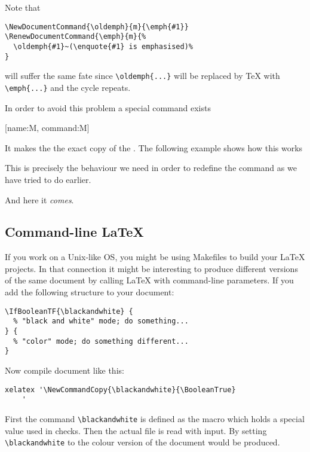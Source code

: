 Note that
\begin{verbatim}
\NewDocumentCommand{\oldemph}{m}{\emph{#1}}
\RenewDocumentCommand{\emph}{m}{%
  \oldemph{#1}~(\enquote{#1} is emphasised)%
}
\end{verbatim}
will suffer the same fate since \verb|\oldemph{...}| will be replaced by \TeX{}
with \verb|\emph{...}| and the cycle repeats.

In order to avoid this problem a special command exists
\begin{lscommand}
  [name:M, command:M]
\end{lscommand}
It makes the  the exact copy of the . The following example shows how this works
\begin{example}[examplewidth=0.35\linewidth]

\NewDocumentCommand{\newfoo}{}{\foo}
\NewCommandCopy{\copiedfoo}{\foo}


\foo{} \newfoo{} \copiedfoo{}
\end{example}

This is precisely the behaviour we need in order to redefine the 
command as we have tried to do earlier.
\begin{example}[examplewidth=0.35\linewidth]
\NewCommandCopy{\oldemph}{\emph}

And here it \emph{comes}.
\end{example}

\subsection{Command-line \LaTeX}

If you work on a Unix-like OS, you might be using Makefiles to build your
\LaTeX{} projects. In that connection it might be interesting to produce
different versions of the same document by calling \LaTeX{} with command-line
parameters. If you add the following structure to your document:

\begin{verbatim}
\IfBooleanTF{\blackandwhite} {
  % "black and white" mode; do something...
} {
  % "color" mode; do something different...
}
\end{verbatim}

Now compile document like this:
\begin{verbatim}
xelatex '\NewCommandCopy{\blackandwhite}{\BooleanTrue}
    '
\end{verbatim}
First the command \verb|\blackandwhite| is defined as the  macro which
holds a special value used in  checks. Then the actual file is
read with input. By setting \verb|\blackandwhite| to  the
colour version of the document would be produced.

